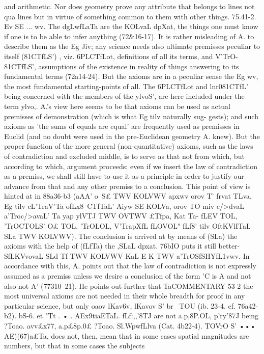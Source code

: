 {{{{{{{{{and arithmetic. Nor does geometry prove any attribute that
belongs to lines not qua lines but in virtue of something common
to them with other things.
75.41-2. Ev SE ... wv. The dgLwfLaTa are the KOLvaL dpXat, the
things one must know if one is to be able to infer anything
(72&16-17). It is rather misleading of A. to describe them as
the Eg Jiv; any science needs also ultimate premisses peculiar to
itself (81CTfLS') , viz. 6PLCTfLot, definitions of all its terms, and V'TrO-
81CTfLS', assumptions of the existence in reality of things answering
to its fundamental terms (72a14-24). But the axioms are in a
peculiar sense the Eg wv, the most fundamental starting-points
of all. The 6PLCTfLot and lnr081CTfL" being concerned with the
members of the ylvoS', are here included under the term ylvo,.
A.'s view here seems to be that axioms can be used as actual
premisses of demonstration (which is what Eg tilv naturally sug-
gests); and such axioms as 'the sums of equals are equal' are
frequently used as premisses in Euclid (and no doubt were used
in the pre-Euclidean geometry A. knew). But the proper function
of the more general (non-quantitative) axioms, such as the laws
of contradiction and excluded middle, is to serve as that not
from which, but according to which, argument proceeds; even
if we insert the law of contradiction as a premiss, we shall still
have to use it as a principle in order to justify our advance from
that and any other premiss to a conclusion. This point of view
is hinted at in 88a36-b3 (aAA' o~S£ TWV KOLVWV apxwv orov T' frvat
TLva, Eg tilv cL'TraV'Ta ofLx8~CTfTaL' Aiyw SE KOLVa, orov TO miv c/>dvaL
~ a'Troc/>avaL' Ta yap ylVTJ TWV OVTWV £Tfpa, Kat Ta- fLEV TOL, 'TrOCTOLS'
O£ TOL, 'TrOLOL, V'TrapXfL fLOVOL" fLf8' tilv OftKVlITaL SLa TWV KOLVWV).
The conclusion is arrived at by means of (SLa) the axioms with the
help of (fLfTa) the ,SLaL dpxat. 76bIO puts it still better-SfLKVvovaL
SLd Tf TWV KOLVWV KaL E K TWV a'TrOSfSHYfL1vwv. In accordance with
this, A. points out that the law of contradiction is not expressly
assumed as a premiss unless we desire a conclusion of the form
'C is A and not also not A' (77310--21). He points out further that
TaCOMMENTARY
53 2
the most universal axioms are not needed in their whole breadth
for proof in any particular science, but only oaov lKav6v, lKavov
S' br~ TOU
(ib. 23-4. cf. 76a42-b2).
bS-6. et "Tt . • . AEx9tiaETaL. fLf:,,'8TJ are not a.p,8P.OL, p'ry'87J
being ?Toao. avv£x77, a.p£8p.0£ ?Toao. Sl.WpwfLlva (Cat. 4b22-4). TOVrO S'
••• AE)(67)a£Ta, does not, then, mean that in some cases spatial
magnitudes are numbers, but that in some cases the subjects
}}}}}}}}}
